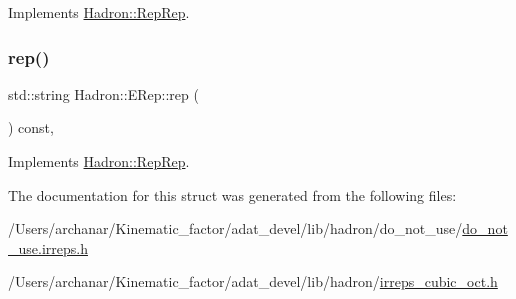 Implements \mbox{\hyperlink{structHadron_1_1RepRep_ab3213025f6de249f7095892109575fde}{Hadron\+::\+Rep\+Rep}}.

\mbox{\label{structHadron_1_1ERep_a388db41e3463a65498dca9ba2e1b7960}} 
\subsubsection{\texorpdfstring{rep()}{rep()}\hspace{0.1cm}{\footnotesize\ttfamily [3/3]}}
{\footnotesize\ttfamily std\+::string Hadron\+::\+E\+Rep\+::rep (\begin{DoxyParamCaption}{ }\end{DoxyParamCaption}) const\hspace{0.3cm}{\ttfamily [inline]}, {\ttfamily [virtual]}}



Implements \mbox{\hyperlink{structHadron_1_1RepRep_ab3213025f6de249f7095892109575fde}{Hadron\+::\+Rep\+Rep}}.



The documentation for this struct was generated from the following files\+:\begin{DoxyCompactItemize}
\item 
/\+Users/archanar/\+Kinematic\+\_\+factor/adat\+\_\+devel/lib/hadron/do\+\_\+not\+\_\+use/\mbox{\hyperlink{do__not__use_8irreps_8h}{do\+\_\+not\+\_\+use.\+irreps.\+h}}\item 
/\+Users/archanar/\+Kinematic\+\_\+factor/adat\+\_\+devel/lib/hadron/\mbox{\hyperlink{lib_2hadron_2irreps__cubic__oct_8h}{irreps\+\_\+cubic\+\_\+oct.\+h}}\end{DoxyCompactItemize}
